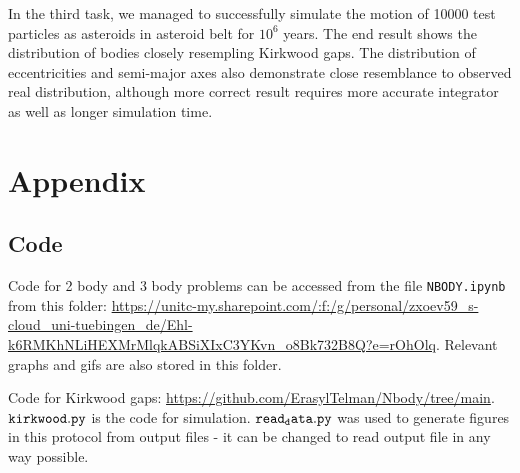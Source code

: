 \documentclass[12pt,a4paper]{article}
\begin{document}
In the third task, we managed to successfully simulate the motion of 10000 test particles as asteroids in asteroid belt for $10^6$ years. The end result shows the distribution of bodies closely resempling Kirkwood gaps. The distribution of eccentricities and semi-major axes also demonstrate close resemblance to observed real distribution, although more correct result requires more accurate integrator as well as longer simulation time.

\setcounter{secnumdepth}{0}

\printbibliography     
\appendix
\section{Appendix}
\subsection{Code}
\label{code}
  Code for 2 body and 3 body problems can be accessed from the file \texttt{NBODY.ipynb} from this folder: \url{https://unitc-my.sharepoint.com/:f:/g/personal/zxoev59_s-cloud_uni-tuebingen_de/Ehl-k6RMKhNLiHEXMrMlqkABSiXIxC3YKvn_o8Bk732B8Q?e=rOhOlq}. 
  Relevant graphs and gifs are also stored in this folder.

  Code for Kirkwood gaps: \url{https://github.com/ErasylTelman/Nbody/tree/main}. $\tt kirkwood.py$ is the code for simulation. $\tt read_data.py$ was used to generate figures in this protocol from output files - it can be changed to read output file in any way possible.
\end{document}
